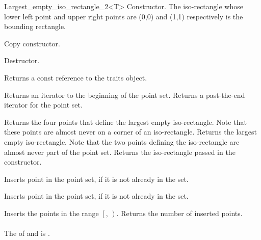 \begin{ccRefClass}{Largest_empty_iso_rectangle_2<T>}
{Constructor. The iso-rectangle whose lower left point and upper right points are (0,0) 
and (1,1) respectively is the bounding rectangle.} 

{Copy constructor.} 

{Destructor.}

\ccOperations
{}


{}



\ccAccessFunctions

{Returns a const reference to the traits object.}


{Returns an iterator to the beginning of the point set.}
{Returns a past-the-end iterator for the point set.}



{Returns the four points that define the largest empty iso-rectangle.
Note that these points are almost never on a corner of an iso-rectangle.}
\ccGlue
{}
{Returns the largest empty iso-rectangle. Note that the two
points defining the iso-rectangle are almost never part of 
the point set.}
\ccGlue
{}
{Returns  the iso-rectangle passed in the constructor.}


{Inserts point  in the point set, if it is not already in the set.}

{Inserts point  in the point set, if it is not already in the set.}


{Inserts the points in the range $\left[\right.$,
$\left.\right)$.  Returns the number of inserted points. \\ \\
\ccRequirements The  of  and  is .}


\end{ccRefClass}

